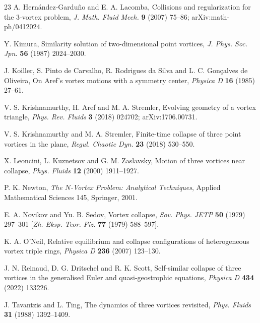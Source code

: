 \documentclass[11pt]{article}
\theoremstyle{definition}
\begin{document}
\begin{thebibliography}{23}
 A. Hern\'andez-Gardu\~no and E. A. Lacomba, Collisions and regularization for the 3-vortex problem, \emph{J. Math. Fluid Mech.} \textbf{9} (2007) 75--86; arXiv:math-ph/0412024.

 Y. Kimura, Similarity solution of two-dimensional point vortices, \emph{J. Phys. Soc. Jpn.} \textbf{56} (1987) 2024--2030.

 J. Koiller, S. Pinto de Carvalho, R. Rodrigues da Silva and L. C. Gon\c{c}alves de Oliveira, On Aref's vortex motions with a symmetry center, \emph{Physica D} \textbf{16} (1985) 27--61.

 V. S. Krishnamurthy, H. Aref and M. A. Stremler, Evolving geometry of a vortex triangle, \emph{Phys. Rev. Fluids} \textbf{3} (2018) 024702; arXiv:1706.00731.

 V. S. Krishnamurthy and M. A. Stremler, Finite-time collapse of three point vortices in the plane, \emph{Regul. Chaotic Dyn.} \textbf{23} (2018) 530--550.

 X. Leoncini, L. Kuznetsov and G. M. Zaslavsky, Motion of three vortices near collapse, \emph{Phys. Fluids} \textbf{12} (2000) 1911--1927.

 P. K. Newton, \emph{The $N$-Vortex Problem: Analytical Techniques}, Applied Mathematical Sciences 145, Springer, 2001.

 E. A. Novikov and Yu. B. Sedov, Vortex collapse, \emph{Sov. Phys. JETP} \textbf{50} (1979) 297--301 [\emph{Zh. Eksp. Teor. Fiz.} \textbf{77} (1979) 588--597].

 K. A. O'Neil, Relative equilibrium and collapse configurations of heterogeneous vortex triple rings, \emph{Physica D} \textbf{236} (2007) 123--130.

 J. N. Reinaud, D. G. Dritschel and R. K. Scott, Self-similar collapse of three vortices in the generalised Euler and quasi-geostrophic equations, \emph{Physica D} \textbf{434} (2022) 133226.

 J. Tavantzis and L. Ting, The dynamics of three vortices revisited, \emph{Phys. Fluids} \textbf{31} (1988) 1392--1409.

\end{thebibliography}
\end{document}
